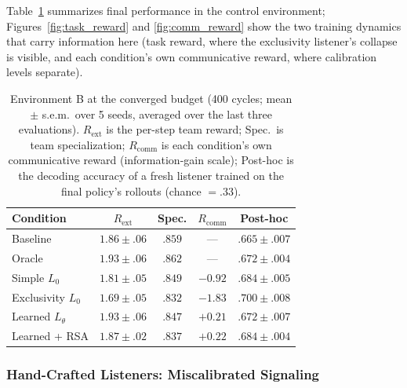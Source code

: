 \documentclass{article}
\newcommand{\Rcomm}{R_{\text{comm}}}
\newcommand{\Rext}{R_{\text{ext}}}
\newcommand{\Ltheta}{L_\theta}
\begin{document}
Table~\ref{tab:final} summarizes final performance in the control environment; Figures~\ref{fig:task_reward} and \ref{fig:comm_reward} show the two training dynamics that carry information here (task reward, where the exclusivity listener's collapse is visible, and each condition's own communicative reward, where calibration levels separate).

\begin{table}[t]
\centering
\caption{Environment B at the converged budget (400 cycles; mean $\pm$ s.e.m.\ over 5 seeds, averaged over the last three evaluations). $\Rext$ is the per-step team reward; Spec.\ is team specialization; $\Rcomm$ is each condition's own communicative reward (information-gain scale); Post-hoc is the decoding accuracy of a fresh listener trained on the final policy's rollouts (chance $=.33$).}
\label{tab:final}
\setlength{\tabcolsep}{3.0pt}
\begin{tabular}{lcccc}
\toprule
\textbf{Condition} & $\Rext$ & Spec. & $\Rcomm$ & Post-hoc \\
\midrule
Baseline & $1.86\pm.06$ & $.859$ & --- & $.665\pm.007$ \\
Oracle & $1.93\pm.06$ & $.862$ & --- & $.672\pm.004$ \\
\midrule
Simple $L_0$ & $1.81\pm.05$ & $.849$ & $-0.92$ & $.684\pm.005$ \\
Exclusivity $L_0$ & $1.69\pm.05$ & $.832$ & $-1.83$ & $.700\pm.008$ \\
\midrule
Learned $\Ltheta$ & $\mathbf{1.93\pm.06}$ & $.847$ & $+0.21$ & $.672\pm.007$ \\
Learned + RSA & $1.87\pm.02$ & $.837$ & $\mathbf{+0.22}$ & $.684\pm.004$ \\
\bottomrule
\end{tabular}
\end{table}

\subsubsection{Hand-Crafted Listeners: Miscalibrated Signaling}
\label{ssec:results_heuristic}
\end{document}
